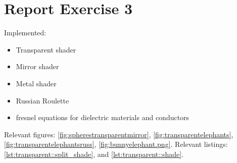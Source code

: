  \section{Report Exercise 3}
 
 Implemented:
 \begin{itemize}
	\item{Transparent shader}
	\item{Mirror shader}
	\item{Metal shader}
	\item{Russian Roulette}
	\item{fresnel equations for dielectric materials and conductors}
 \end{itemize}
 
 Relevant figures: \ref{fig:spherestransparentmirror}, \ref{fig:transparentelephants}, \ref{fig:transparentelephantsruss}, \ref{fig:bunnyelephant.png}. Relevant listings: \ref{lst:transparent::split_shade}, and \ref{lst:transparent::shade}.
 
